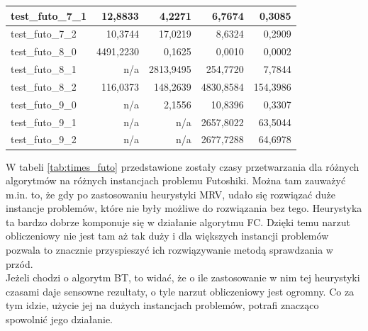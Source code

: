 \documentclass{article}
\begin{document}
\begin{table}[H]
\begin{center}
\begin{tabular}{|l|r|r|r|r|}
				test\_futo\_7\_1 & 12,8833                          & 4,2271                           & 6,7674                                 & 0,3085                                 \\ \hline
				test\_futo\_7\_2 & 10,3744                          & 17,0219                          & 8,6324                                 & 0,2909                                 \\ \hline
				test\_futo\_8\_0 & 4491,2230                        & 0,1625                           & 0,0010                                 & 0,0002                                 \\ \hline
				test\_futo\_8\_1 & n/a                              & 2813,9495                        & 254,7720                               & 7,7844                                 \\ \hline
				test\_futo\_8\_2 & 116,0373                         & 148,2639                         & 4830,8584                              & 154,3986                               \\ \hline
				test\_futo\_9\_0 & n/a                              & 2,1556                           & 10,8396                                & 0,3307                                 \\ \hline
				test\_futo\_9\_1 & n/a                              & n/a                              & 2657,8022                              & 63,5044                                \\ \hline
				test\_futo\_9\_2 & n/a                              & n/a                              & 2677,7288                              & 64,6978                                \\ \hline
			\end{tabular}
		\end{center}
	\end{table}

	W tabeli \ref{tab:times_futo} przedstawione zostały czasy przetwarzania dla różnych algorytmów na różnych instancjach problemu Futoshiki. Można tam zauważyć m.in. to, że gdy po zastosowaniu heurystyki MRV, udało się rozwiązać duże instancje problemów, które nie były możliwe do rozwiązania bez tego. Heurystyka ta bardzo dobrze komponuje się w działanie algorytmu FC. Dzięki temu narzut obliczeniowy nie jest tam aż tak duży i dla większych instancji problemów pozwala to znacznie przyspieszyć ich rozwiązywanie metodą sprawdzania w przód.\\
	Jeżeli chodzi o algorytm BT, to widać, że o ile zastosowanie w nim tej heurystyki czasami daje sensowne rezultaty, o tyle narzut obliczeniowy jest ogromny. Co za tym idzie, użycie jej na dużych instancjach problemów, potrafi znacząco spowolnić jego działanie.
	
\end{document}
